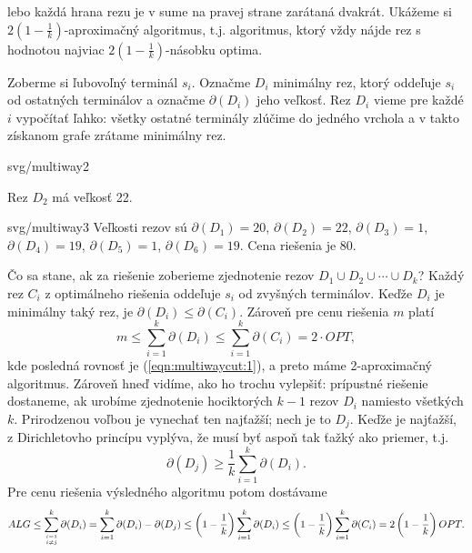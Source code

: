 lebo každá hrana rezu je v sume na pravej strane zarátaná dvakrát.
Ukážeme si $2(1-\frac{1}{k})$-aproximačný algoritmus, t.j. algoritmus, ktorý vždy
nájde rez s hodnotou najviac $2(1-\frac{1}{k})$-násobku optima. 

Zoberme si ľubovoľný terminál $s_i$. 
Označme $D_i$ minimálny rez, ktorý oddeľuje $s_i$ 
od ostatných terminálov a označme $\partial(D_i)$ jeho veľkosť. 
Rez $D_i$ vieme pre každé $i$ vypočítať ľahko: všetky ostatné terminály zlúčime do jedného
vrchola a v takto získanom grafe zrátame minimálny rez.

\begin{minipage}[t]{0.45\textwidth}
  \vskip 0pt
\begin{myfig}{\textwidth}{svg/multiway2}
  \centerline{Rez $D_2$ má veľkosť 22.}
\end{myfig}
\end{minipage}
\hfill
\begin{minipage}[t]{0.45\textwidth}
  \vskip 0pt
\begin{myfig}{\textwidth}{svg/multiway3}
  Veľkosti rezov sú 
    $\partial(D_1)=20$,
    $\partial(D_2)=22$,
    $\partial(D_3)=1$,
    $\partial(D_4)=19$,
    $\partial(D_5)=1$,
    $\partial(D_6)=19$. Cena riešenia je $80$.
\end{myfig}
\end{minipage}

Čo sa stane, ak  za riešenie zoberieme zjednotenie rezov $D_1\cup D_2\cup\cdots\cup D_k$?
Každý rez $C_i$ z optimálneho riešenia oddeľuje $s_i$ od zvyšných terminálov. Keďže $D_i$ je minimálny
taký rez, je $\partial(D_i)\le\partial(C_i)$.
Zároveň pre cenu riešenia $m$ platí 
$$m\le\sum_{i=1}^k\partial(D_i)\le\sum_{i=1}^k\partial(C_i)=2\cdot OPT,$$
kde posledná rovnosť je (\ref{eqn:multiwaycut:1}), a preto máme 2-aproximačný algoritmus. Zároveň hneď vidíme,
ako ho trochu vylepšiť: prípustné riešenie dostaneme, ak urobíme zjednotenie hociktorých $k-1$ rezov  $D_i$ namiesto
všetkých $k$. Prirodzenou voľbou je vynechať ten najťažší; nech je to $D_j$. Keďže je najťažší, z Dirichletovho
princípu vyplýva, že musí byť aspoň tak ťažký ako priemer, t.j.
$$\partial(D_j)\ge\frac{1}{k}\sum_{i=1}^k\partial(D_i).$$
Pre cenu riešenia výsledného algoritmu potom dostávame
$$ALG\le\sum_{i=1\atop i\not=j}^k\partial(D_i)=\sum_{i=1}^k\partial(D_i)-\partial(D_j)\le
\left(1-\frac{1}{k}\right)\sum_{i=1}^k\partial(D_i)\le
\left(1-\frac{1}{k}\right)\sum_{i=1}^k\partial(C_i)=2\left(1-\frac{1}{k}\right) OPT.$$


